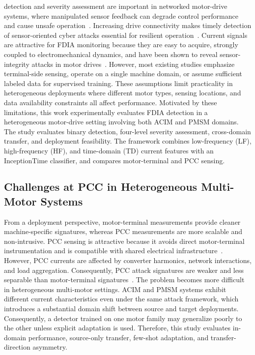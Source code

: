 \documentclass[lettersize,journal]{IEEEtran}
\begin{document}
 detection and severity assessment are important in networked motor-drive systems, where manipulated sensor feedback can degrade control performance and cause unsafe operation~\cite{Ghaderi2021A}. Increasing drive connectivity makes timely detection of sensor-oriented cyber attacks essential for resilient operation~\cite{Yang2022Fast,Yang2024Enhanced}.
Current signals are attractive for FDIA monitoring because they are easy to acquire, strongly coupled to electromechanical dynamics, and have been shown to reveal sensor-integrity attacks in motor drives~\cite{7944701, YangVulnerability}. However, most existing studies emphasize terminal-side sensing, operate on a single machine domain, or assume sufficient labeled data for supervised training. These assumptions limit practicality in heterogeneous deployments where different motor types, sensing locations, and data availability constraints all affect performance.
Motivated by these limitations, this work experimentally evaluates FDIA detection in a heterogeneous motor-drive setting involving both ACIM and PMSM domains. The study evaluates binary detection, four-level severity assessment, cross-domain transfer, and deployment feasibility. The framework combines low-frequency (LF), high-frequency (HF), and time-domain (TD) current features with an InceptionTime classifier, and compares motor-terminal and PCC sensing.

\subsection{Challenges at PCC in Heterogeneous Multi-Motor Systems}
\label{sec:pcc_challenges}

From a deployment perspective, motor-terminal measurements provide cleaner machine-specific signatures, whereas PCC measurements are more scalable and non-intrusive. PCC sensing is attractive because it avoids direct motor-terminal instrumentation and is compatible with shared electrical infrastructure~\cite{7271086}. However, PCC currents are affected by converter harmonics, network interactions, and load aggregation. Consequently, PCC attack signatures are weaker and less separable than motor-terminal signatures~\cite{10005067}.
The problem becomes more difficult in heterogeneous multi-motor settings. ACIM and PMSM systems exhibit different current characteristics even under the same attack framework, which introduces a substantial domain shift between source and target deployments. Consequently, a detector trained on one motor family may generalize poorly to the other unless explicit adaptation is used. Therefore, this study evaluates in-domain performance, source-only transfer, few-shot adaptation, and transfer-direction asymmetry.
\end{document}
